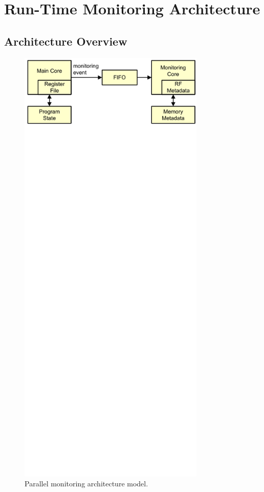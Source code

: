 \section{Run-Time Monitoring Architecture}
\label{sec:monitoring_wcet.monitoring}

\subsection{Architecture Overview}

\begin{figure}
  \begin{center}
    \includegraphics[width=3.5in]{monitoring_wcet/figs/arch.pdf}
    \caption{Parallel monitoring architecture model.}
    \label{fig:monitoring_wcet.monitoring.arch} 
  \end{center}
\end{figure}

